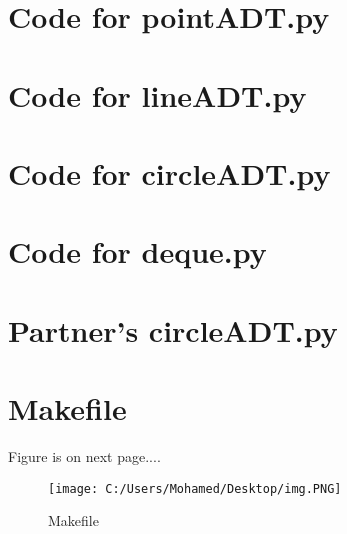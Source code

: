 \documentclass[12pt]{article}
\begin{document}
\def\thesection{\Alph{section}} 

\section{Code for pointADT.py} \label{PointTSect}

\noindent 

\newpage



\section{Code for lineADT.py}

\noindent 


\newpage

\section{Code for circleADT.py} \label{CircleSect}

\noindent 


\newpage

\section{Code for deque.py}

\noindent 


\newpage

\section{Partner's circleADT.py} \label{PartSec}

\noindent 




\section{Makefile} \label{MakefileSect}
Figure is on next page....

\begin{figure}[b]


\centering

\texttt{[image: C:/Users/Mohamed/Desktop/img.PNG]}

\caption{Makefile}

\label{Figure : example}

\end{figure}
\end{document}
